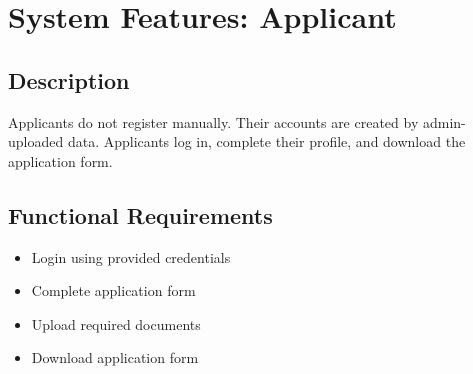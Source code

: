 \section{System Features: Applicant}

\subsection{Description}
Applicants do not register manually. Their accounts are created by admin-uploaded data. Applicants log in, complete their profile, and download the application form.

\subsection{Functional Requirements}

\begin{itemize}
    \item Login using provided credentials
    \item Complete application form
    \item Upload required documents
    \item Download application form
\end{itemize}